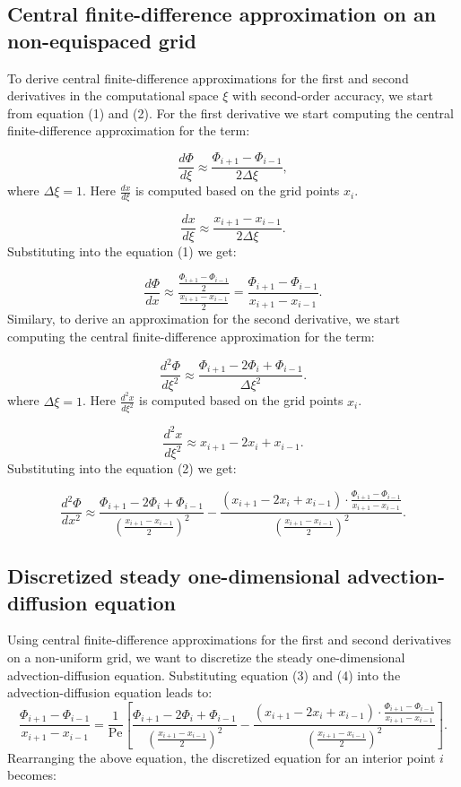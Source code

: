 \documentclass{article}
\begin{document}
\subsection{Central finite-difference approximation on an non-equispaced grid}
To derive central finite-difference approximations for the first and second derivatives in the computational space \(\xi\) with second-order 
accuracy, we start from equation (1) and (2). For the first derivative we start computing the central finite-difference approximation for the term:

\[
\frac{d\Phi}{d\xi} \approx \frac{\Phi_{i+1} - \Phi_{i-1}}{2\Delta \xi},
\]
where \(\Delta \xi = 1\). Here \(\frac{dx}{d\xi}\) is computed based on the grid points \(x_i\).

\[
\frac{dx}{d\xi} \approx \frac{x_{i+1} - x_{i-1}}{2\Delta \xi}.
\]
Substituting into the equation (1) we get:

\begin{equation}
\frac{d\Phi}{dx} \approx \frac{\frac{\Phi_{i+1} - \Phi_{i-1}}{2}}{\frac{x_{i+1} - x_{i-1}}{2}} = \frac{\Phi_{i+1} - \Phi_{i-1}}{x_{i+1} - x_{i-1}}.
\end{equation}
Similary, to derive an approximation for the second derivative, we start computing the central finite-difference approximation for the term:

\[
\frac{d^2\Phi}{d\xi^2} \approx \frac{\Phi_{i+1} - 2\Phi_i + \Phi_{i-1}}{\Delta \xi^2}.
\]
where \(\Delta \xi = 1\). Here \(\frac{d^2x}{d\xi^2}\) is computed based on the grid points \(x_i\).

\[
\frac{d^2x}{d\xi^2} \approx x_{i+1} - 2x_i + x_{i-1}.
\]
Substituting into the equation (2) we get:

\begin{equation}
\frac{d^2\Phi}{dx^2} \approx \frac{\Phi_{i+1} - 2\Phi_i + \Phi_{i-1}}{\left(\frac{x_{i+1} - x_{i-1}}{2}\right)^2} - \frac{\left(x_{i+1} - 2x_i + x_{i-1}\right) \cdot \frac{\Phi_{i+1} - \Phi_{i-1}}{x_{i+1} - x_{i-1}}}{\left(\frac{x_{i+1} - x_{i-1}}{2}\right)^2}.
\end{equation}

\subsection{Discretized steady one-dimensional advection-diffusion equation}
Using central finite-difference approximations for the first and second derivatives on a non-uniform grid, we want to discretize 
the steady one-dimensional advection-diffusion equation. Substituting equation (3) and (4) into the advection-diffusion equation leads to:
\[
\frac{\Phi_{i+1} - \Phi_{i-1}}{x_{i+1} - x_{i-1}} = \frac{1}{\text{Pe}} \left[ \frac{\Phi_{i+1} - 2\Phi_i + \Phi_{i-1}}{\left(\frac{x_{i+1} - x_{i-1}}{2}\right)^2} - \frac{\left(x_{i+1} - 2x_i + x_{i-1}\right) \cdot \frac{\Phi_{i+1} - \Phi_{i-1}}{x_{i+1} - x_{i-1}}}{\left(\frac{x_{i+1} - x_{i-1}}{2}\right)^2} \right].
\]
Rearranging the above equation, the discretized equation for an interior point \(i\) becomes:
\end{document}
